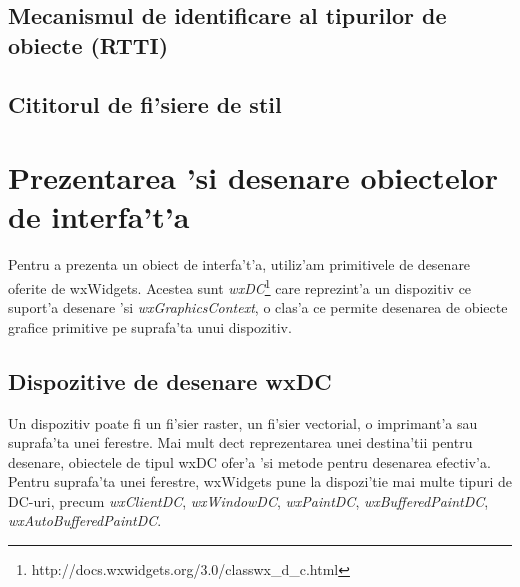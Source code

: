 \subsection{Mecanismul de identificare al tipurilor de obiecte (RTTI)}

\subsection{Cititorul de fi'siere de stil}


\section{Prezentarea 'si desenare obiectelor de interfa't'a}

Pentru a prezenta un obiect de interfa't'a, utiliz'am primitivele de desenare oferite de wxWidgets. Acestea sunt \emph{wxDC}\footnote{http://docs.wxwidgets.org/3.0/classwx\_d\_c.html} care reprezint'a un dispozitiv ce suport'a desenare 'si \emph{wxGraphicsContext}, o clas'a ce permite desenarea de obiecte grafice primitive pe suprafa'ta unui dispozitiv. 

\subsection{Dispozitive de desenare wxDC}

Un dispozitiv poate fi un fi'sier raster, un fi'sier vectorial, o imprimant'a sau suprafa'ta unei ferestre. Mai mult dec{\ia}t reprezentarea unei destina'tii pentru desenare, obiectele de tipul wxDC ofer'a 'si metode pentru desenarea efectiv'a. Pentru suprafa'ta unei ferestre, wxWidgets pune la dispozi'tie mai multe tipuri de DC-uri, precum \emph{wxClientDC}, \emph{wxWindowDC}, \emph{wxPaintDC}, \emph{wxBufferedPaintDC}, \emph{wxAutoBufferedPaintDC}.

